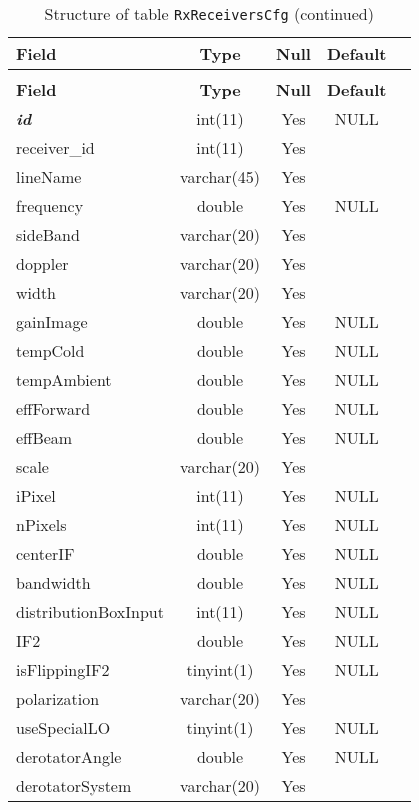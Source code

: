 %
%
 \begin{longtable}{lcccl}
 
 \caption{Structure of table \texttt{RxReceiversCfg}} \label{tab:RxReceiversCfg-structure} \\
 \addlinespace \textbf{Field} & \textbf{Type} & \textbf{Null} & \textbf{Default}  \\ \midrule
\endfirsthead
 \caption*{Structure of table \texttt{RxReceiversCfg} (continued)} \\ 
 \addlinespace \textbf{Field} & \textbf{Type} & \textbf{Null} & \textbf{Default}  \\ \midrule \endhead \endfoot
\textbf{\textit{id}} & int(11) & Yes & NULL \\ \addlinespace 
receiver\_id & int(11) & Yes &  \\ \addlinespace 
lineName & varchar(45) & Yes &  \\ \addlinespace 
frequency & double & Yes & NULL \\ \addlinespace 
sideBand & varchar(20) & Yes &  \\ \addlinespace 
doppler & varchar(20) & Yes &  \\ \addlinespace 
width & varchar(20) & Yes &  \\ \addlinespace 
gainImage & double & Yes & NULL \\ \addlinespace 
tempCold & double & Yes & NULL \\ \addlinespace 
tempAmbient & double & Yes & NULL \\ \addlinespace 
effForward & double & Yes & NULL \\ \addlinespace 
effBeam & double & Yes & NULL \\ \addlinespace 
scale & varchar(20) & Yes &  \\ \addlinespace 
iPixel & int(11) & Yes & NULL \\ \addlinespace 
nPixels & int(11) & Yes & NULL \\ \addlinespace 
centerIF & double & Yes & NULL \\ \addlinespace 
bandwidth & double & Yes & NULL \\ \addlinespace 
distributionBoxInput & int(11) & Yes & NULL \\ \addlinespace 
IF2 & double & Yes & NULL \\ \addlinespace 
isFlippingIF2 & tinyint(1) & Yes & NULL \\ \addlinespace 
polarization & varchar(20) & Yes &  \\ \addlinespace 
useSpecialLO & tinyint(1) & Yes & NULL \\ \addlinespace 
derotatorAngle & double & Yes & NULL \\ \addlinespace 
derotatorSystem & varchar(20) & Yes &  \\  
 \end{longtable}

